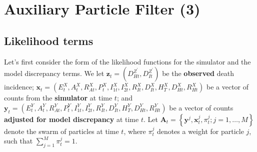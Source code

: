 \documentclass[a4paper]{article}
\newcommand{\bx}{\bm{x}}
\newcommand{\by}{\bm{y}}
\newcommand{\bz}{\bm{z}}
\newcommand{\bA}{\bm{A}}
\begin{document}
% 
% 
% 
% 
% 
% 
% 
% 
% 
% 

\section{Auxiliary Particle Filter (3)}

\subsection{Likelihood terms}

Let's first consider the form of the likelihood functions for the simulator and the model discrepancy terms. We let $\bz_t = \left(D^{Z^\prime}_{Ht}, D^{Z^\prime}_{It}\right)$ be the \textbf{observed} death incidence; $\bx_t = \left(E^X_t, A^X_t, R^X_{At}, P^X_t, I^X_{1t}, I^X_{2t}, R^X_{It}, D^X_{It}, H^X_T, D^X_{Ht}, R^X_{Ht}\right)$ be a vector of counts from the \textbf{simulator} at time $t$; and $\by_t = \left(E^Y_t, A^Y_t, R^Y_{At}, P^Y_t, I^Y_{1t}, I^Y_{2t}, R^Y_{It}, D^Y_{It}, H^Y_T, D^Y_{Ht}, R^Y_{Ht}\right)$ be a vector of counts \textbf{adjusted for model discrepancy} at time $t$. Let $\bA_t = \left\{\by^j, \bx^j_t, \pi^j_t; j = 1, \dots, M\right\}$ denote the swarm of particles at time $t$, where $\pi^j_t$ denotes a weight for particle $j$, such that $\sum_{j = 1}^M \pi^j_t = 1$.
\end{document}
